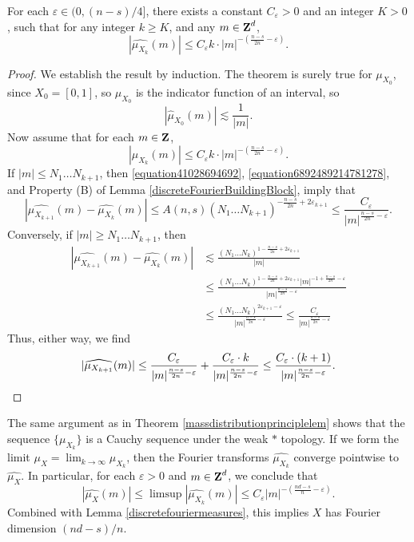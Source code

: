 \begin{lemma}
    For each $\varepsilon \in (0, (n-s)/4]$, there exists a constant $C_\varepsilon > 0$ and an integer $K > 0$, such that for any integer $k \geq K$, and any $m \in \operatorname{\mathbf{Z}}^d$,
    \[ |\widehat{\mu_{X_k}}(m)| \leq C_\varepsilon k \cdot |m|^{- \left( \frac{n - s}{2n} - \varepsilon \right)}. \]
\end{lemma}
\begin{proof}
    We establish the result by induction. The theorem is surely true for $\mu_{X_0}$, since $X_0 = [0,1]$, so $\mu_{X_0}$ is the indicator function of an interval, so
    \[ |\widehat{\mu}_{X_0}(m)| \lesssim \frac{1}{|m|}. \]
    Now assume that for each $m \in \operatorname{\mathbf{Z}}$,
    \[ |\widehat{\mu}_{X_k}(m)| \leq C_\varepsilon k \cdot |m|^{- \left( \frac{n - s}{2n} - \varepsilon \right)}. \]
    If $|m| \leq N_1 \dots N_{k+1}$, then \eqref{equation41028694692}, \eqref{equation6892489214781278}, and Property (B) of Lemma \eqref{discreteFourierBuildingBlock}, imply that
    \[ |\widehat{\mu_{X_{k+1}}}(m) - \widehat{\mu_{X_k}}(m)| \leq A(n,s) (N_1 \dots N_{k+1})^{-\frac{n - s}{2n} + 2\varepsilon_{k+1}} \leq \frac{C_\varepsilon}{|m|^{\frac{n-s}{2n} - \varepsilon}}. \]
    Conversely, if $|m| \geq N_1 \dots N_{k+1}$, then
    \begin{align*}
        |\widehat{\mu_{X_{k+1}}}(m) - \widehat{\mu_{X_k}}(m)| &\lesssim \frac{(N_1 \dots N_k)^{1 - \frac{n-s}{2n} + 2\varepsilon_{k+1}}}{|m|}\\
        &\leq \frac{(N_1 \dots N_k)^{1 - \frac{n-s}{2n} + 2\varepsilon_{k+1}} |m|^{-1 + \frac{n-s}{2n} - \varepsilon}}{|m|^{\frac{n-s}{2n} - \varepsilon}}\\
        &\leq \frac{(N_1 \dots N_k)^{2\varepsilon_{k+1} - \varepsilon}}{|m|^{\frac{n-s}{2n} - \varepsilon}} \leq \frac{C_\varepsilon}{|m|^{\frac{n-s}{2n} - \varepsilon}}
    \end{align*}
    Thus, either way, we find
    \[ |\widehat{\mu_{X_{k+1}}}(m)| \leq \frac{C_\varepsilon}{|m|^{\frac{n-s}{2n} - \varepsilon}} + \frac{C_\varepsilon \cdot k}{|m|^{\frac{n-s}{2n} - \varepsilon}} \leq \frac{C_\varepsilon \cdot (k+1)}{|m|^{\frac{n-s}{2n} - \varepsilon}}. \qedhere \]
\end{proof}

The same argument as in Theorem \ref{massdistributionprinciplelem} shows that the sequence $\{ \mu_{X_k} \}$ is a Cauchy sequence under the weak $*$ topology. If we form the limit $\mu_X = \lim_{k \to \infty} \mu_{X_k}$, then the Fourier transforms $\widehat{\mu_{X_k}}$ converge pointwise to $\widehat{\mu_X}$. In particular, for each $\varepsilon > 0$ and $m \in \operatorname{\mathbf{Z}}^d$, we conclude that
%
\[ |\widehat{\mu_X}(m)| \leq \limsup |\widehat{\mu_{X_k}}(m)| \leq C_\varepsilon |m|^{- \left( \frac{nd - s}{n} - \varepsilon \right)}. \]
%
Combined with Lemma \ref{discretefouriermeasures}, this implies $X$ has Fourier dimension $(nd - s)/n$.

\endinput
